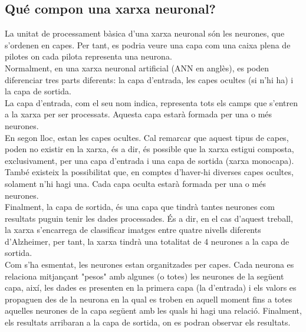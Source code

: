\documentclass[a4paper,12pt]{report}
\begin{document}
\subsection*{Qué compon una xarxa neuronal?}
La unitat de processament bàsica d'una xarxa neuronal són les neurones, que s'ordenen en capes. Per tant, es podria veure una capa com una caixa plena de pilotes on cada pilota representa una neurona.\\
Normalment, en una xarxa neuronal artificial (ANN en anglès), es poden diferenciar tres parts diferents: la capa d'entrada, les capes ocultes (si n'hi ha) i la capa de sortida.\\
La capa d'entrada, com el seu nom indica, representa tots els camps que s'entren a la xarxa per ser processats. Aquesta capa estarà formada per una o més neurones.\\
En segon lloc, estan les capes ocultes. Cal remarcar que aquest tipus de capes, poden no existir en la xarxa, és a dir, és possible que la xarxa estigui composta, exclusivament, per una capa d'entrada i una capa de sortida (xarxa monocapa). També existeix la possibilitat que, en comptes d'haver-hi diverses capes ocultes, solament n'hi hagi una. Cada capa oculta estarà formada per una o més neurones.\\
Finalment, la capa de sortida, és una capa que tindrà tantes neurones com resultats puguin tenir les dades processades. És a dir, en el cas d'aquest treball, la xarxa s'encarrega de classificar imatges entre quatre nivells diferents d'Alzheimer, per tant, la xarxa tindrà una totalitat de 4 neurones a la capa de sortida.\\
Com s'ha esmentat, les neurones estan organitzades per capes. Cada neurona es relaciona mitjançant "pesos" amb algunes (o totes) les neurones de la següent capa, així, les dades es presenten en la primera capa (la d'entrada) i els valors es propaguen des de la neurona en la qual es troben en aquell moment fins a totes aquelles neurones de la capa següent amb les quals hi hagi una relació. Finalment, els resultats arribaran a la capa de sortida, on es podran observar els resultats.
\end{document}

